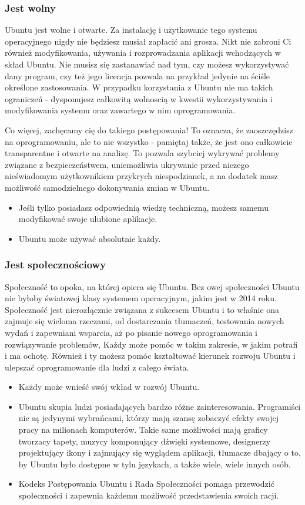 \subsubsection{Jest wolny}
Ubuntu jest wolne i otwarte. Za instalację i użytkowanie tego systemu operacyjnego nigdy nie będziesz musiał zapłacić ani grosza. Nikt nie zabroni Ci również  modyfikowania, używania i rozprowadzania aplikacji wchodzących w skład Ubuntu. Nie musisz się zastanawiać nad tym, czy możesz wykorzystywać dany program, czy też jego licencja pozwala na przykład jedynie na ściśle określone zastosowania. W przypadku korzystania z Ubuntu nie ma takich ograniczeń - dysponujesz całkowitą wolnoscią w kwestii wykorzystywania i modyfikowania systemu oraz zawartego w nim oprogramowania.

Co więcej, zachęcamy cię do takiego postępowania! To oznacza, że zaoszczędzisz na oprogramowaniu, ale to nie wszystko - pamiętaj także, że jest ono całkowicie transparentne i otwarte na analizę. To pozwala szybciej wykrywać problemy związane z bezpieczeństwem, uniemożliwia ukrywanie przed niczego nieświadomym użytkownikiem przykrych niespodzianek, a na dodatek masz możliwość samodzielnego  dokonywania zmian w Ubuntu.
\begin{itemize}
\item Jeśli tylko posiadasz odpowiednią wiedzę techniczną, możesz samemu modyfikować swoje ulubione aplikacje.
\item Ubuntu może używać absolutnie każdy.
\end{itemize}

\subsubsection{Jest społecznościowy}
Społeczność to opoka, na której opiera się Ubuntu. Bez owej społeczności Ubuntu nie byłoby światowej klasy systemem operacyjnym, jakim jest w 2014 roku. Społeczność jest nierozłącznie związana z sukcesem Ubuntu i to właśnie ona zajmuje się wieloma rzeczami, od dostarczania tłumaczeń, testowania nowych wydań i zapewniani wsparcia, aż po pisanie nowego oprogramowania i rozwiązywanie problemów,  Każdy może pomóc w takim zakresie, w jakim potrafi i ma ochotę. Również i ty możesz pomóc kształtować kierunek rozwoju Ubuntu i ulepszać oprogramowanie dla ludzi z całego świata.
\begin{itemize}
\item Każdy może wnieść swój wkład w rozwój Ubuntu.
\item Ubuntu skupia ludzi posiadających bardzo różne zainteresowania. Programiści nie są jedynymi wybrańcami, którzy mają szansę zobaczyć efekty swojej pracy na milionach komputerów. Takie same możliwości mają graficy tworzacy tapety, muzycy komponujący dźwięki systemowe, designerzy projektujący ikony i zajmujący się wyglądem aplikacji, tłumacze dbający o to, by Ubuntu było dostępne w tylu językach, a także wiele, wiele innych osób.
\item Kodeks Postępowania Ubuntu i Rada Społeczności pomaga przewodzić społeczności i zapewnia każdemu możliwość przedstawienia swoich racji.
\end{itemize}
\clearpage



